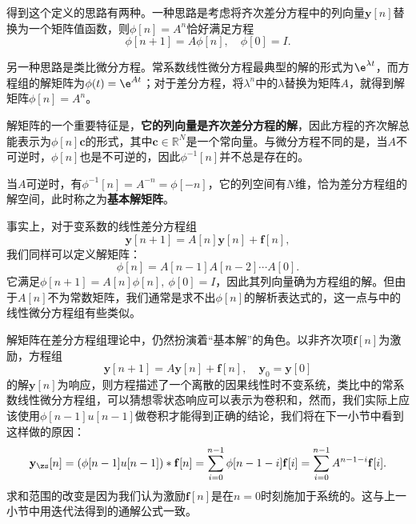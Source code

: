 得到这个定义的思路有两种。一种思路是考虑将齐次差分方程中的列向量$\mathbf{y}[n]$替换为一个矩阵值函数，则$\phi[n]=A^n$恰好满足方程
\begin{equation}
    \phi[n+1]=A\phi[n],\quad \phi[0]=I.
\end{equation}

另一种思路是类比微分方程。常系数线性微分方程最典型的解的形式为$\e^{\lambda t}$，而方程组的解矩阵为$\phi(t)=\e^{At}$；对于差分方程，将$\lambda^n$中的$\lambda$替换为矩阵$A$，就得到解矩阵$\phi[n]=A^n$。

解矩阵的一个重要特征是，\textbf{它的列向量是齐次差分方程的解}，因此方程的齐次解总能表示为$\phi[n]\mathbf{c}$的形式，其中$\mathbf{c}\in\mathbb{R}^N$是一个常向量。与微分方程不同的是，当$A$不可逆时，$\phi[n]$也是不可逆的，因此$\phi^{-1}[n]$并不总是存在的。

当$A$可逆时，有$\phi^{-1}[n]=A^{-n}=\phi[-n]$，它的列空间有$N$维，恰为差分方程组的解空间，此时称之为\textbf{基本解矩阵}。

事实上，对于变系数的线性差分方程组
\begin{equation}
    \mathbf{y}[n+1]=A[n]\mathbf{y}[n]+\mathbf{f}[n],
\end{equation}
我们同样可以定义解矩阵：
\begin{equation}
    \phi[n]=A[n-1]A[n-2]\cdots A[0].
\end{equation}
它满足$\phi[n+1]=A[n]\phi[n],\ \phi[0]=I$，因此其列向量确为方程组的解。但由于$A[n]$不为常数矩阵，我们通常是求不出$\phi[n]$的解析表达式的，这一点与中的线性微分方程组有些类似。

解矩阵在差分方程组理论中，仍然扮演着“基本解”的角色。以非齐次项$\mathbf{f}[n]$为激励，方程组
\begin{equation}
    \mathbf{y}[n+1]=A\mathbf{y}[n]+\mathbf{f}[n],\quad \mathbf{y}_0=\mathbf{y}[0]
\end{equation}
的解$\mathbf{y}[n]$为响应，则方程描述了一个离散的因果线性时不变系统，类比中的常系数线性微分方程组，可以猜想零状态响应可以表示为卷积和，然而，我们实际上应该使用$\phi[n-1]u[n-1]$做卷积才能得到正确的结论，我们将在下一小节中看到这样做的原因：
\begin{equation}
    \mathbf{y}_{\zs}[n]=(\phi[n-1]u[n-1])*\mathbf{f}[n]=\sum_{i=0}^{n-1}\phi[n-1-i]\mathbf{f}[i]=\sum_{i=0}^{n-1}A^{n-1-i}\mathbf{f}[i].
\end{equation}
求和范围的改变是因为我们认为激励$\mathbf{f}[n]$是在$n=0$时刻施加于系统的。这与上一小节中用迭代法得到的通解公式一致。

